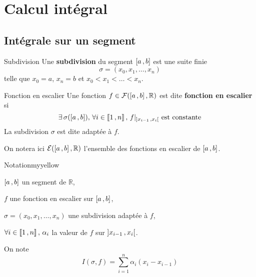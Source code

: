 \chapter{Calcul intégral}
\chaptertoc

\section{Intégrale sur un segment}

    \begin{defi}{Subdivision}{}
        Une \textbf{subdivision} du segment $\left[ a \, , b \right]$ est une suite finie 
        \[ \sigma =  (x_0, x_1,\ldots,x_n) \] telle que $x_0 = a$, $x_n = b$ et $x_0 < x_1 < \ldots < x_n$.
    \end{defi}

    \begin{defi}{Fonction en escalier}{}
        Une fonction $f \in \mathcal{F}(\left[ a \, , b \right], \mathbb{R})$ est dite \textbf{fonction en escalier} si 
        \[ \exists \, \sigma(\left[ a \, , b \right]), \, \forall i \in \left\llbracket 1 \, , n \right\rrbracket, \, f \vert_{\left] x_{i-1} \, , x_i \right[} \text{ est constante} \]
        La subdivision $\sigma$ est dite adaptée à $f$. 
        
        On notera ici $\mathcal{E}(\left[ a \, , b \right],\mathbb{R})$ l’ensemble des fonctions en escalier de $\left[ a \, , b \right]$.
    \end{defi}

    \begin{omed}{Notation}{myyellow}
        \begin{soient} 
            \item $\left[ a \, , b \right]$ un segment de $\mathbb{R}$,
            \item $f$ une fonction en escalier sur $\left[ a \, , b \right]$,
            \item $\sigma = (x_0,x_1,\ldots,x_n)$ une subdivision adaptée à $f$,
            \item $\forall i \in \left\llbracket 1 \, , n \right\rrbracket, \, \alpha_i$ la valeur de $f$ sur $\left] x_{i-1} \, , x_i \right[$.
        \end{soient}
        On note 
        \[  I(\sigma,f) = \sum\limits_{i=1}^n \alpha_i (x_i - x_{i-1}) \]
    \end{omed}

